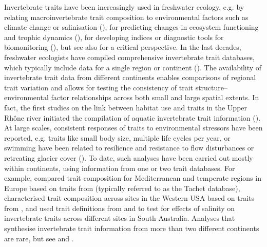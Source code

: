 \documentclass[12pt]{article}
\begin{document}
Invertebrate traits have been increasingly used in freshwater ecology, e.g. by relating macroinvertebrate trait composition to environmental factors such as climate change or salinisation (\cite{bhowmik_large_2015, contiTraitbasedApproachAssess2014, poff_developing_2010, szocs_effects_2014}), for predicting changes in ecosystem functioning and trophic dynamics (\cite{gutierrez-canovasPopulationsHighvaluePredators2021, vos_taxonomic_2017}), for developing indices or diagnostic tools for biomonitoring (\cite{beketov_spear_2009, doledecInvertebrateTraitsBiomonitoring2008a, mondyUsingConditionalTree2013}), but see also \citet{hamiltonLimitationsTraitbasedApproaches2020} for a critical perspective. In the last decades, freshwater ecologists have compiled comprehensive invertebrate trait databases, which typically include data for a single region or continent (\cite{gayraudInvertebrateTraitsBiomonitoring2003, keffordIntegratedDatabaseStream2020a, Philips_and_Smith_NZ_DB_2018, schmidt-kloiber_www.freshwaterecology.info_2015,
statznerConservationTaxonomicBiological2007, tomanova_trophic_2006, ussegliopolatera_biological_2000, vieira_database_nodate}). The availability of invertebrate trait data from different continents enables comparisons of regional trait variation and allows for testing the consistency of trait structure–environmental factor relationships across both small and large spatial extents. In fact, the first studies on the link between habitat use and traits in the Upper Rhône river initiated the compilation of aquatic invertebrate trait information (\cite{bournaudApproachSynthesisQualitative1992,usseglio-polateraTheoreticalHabitatTemplets1994}). At large scales, consistent responses of traits to environmental stressors have been reported, e.g. traits like small body size, multiple life cycles per year, or swimming have been related to resilience and resistance to flow disturbances or retreating glacier cover (\cite{bonada_taxonomic_2007, brown_functional_2018}). To date, such analyses have been carried out mostly within continents, using information from one or two trait databases. For example, \citet{bonada_taxonomic_2007} compared trait composition for Mediterranean and temperate regions in Europe based on traits from \citet{ussegliopolatera_biological_2000} (typically referred to as the Tachet database), \citet{poff_developing_2010} characterised trait composition across sites in the Western USA based on traits from \citet{poff_functional_2006}, and \citet{botwe_effects_2018} used trait definitions from \citet{poff_functional_2006} and \citet{schafer_trait_2011} to test for effects of salinity on invertebrate traits across different sites in South Australia. Analyses that synthesise invertebrate trait information from more than two different continents are rare, but see \citet{brown_functional_2018} and \citet{statzner_reproductive_1997}. 
\end{document}
